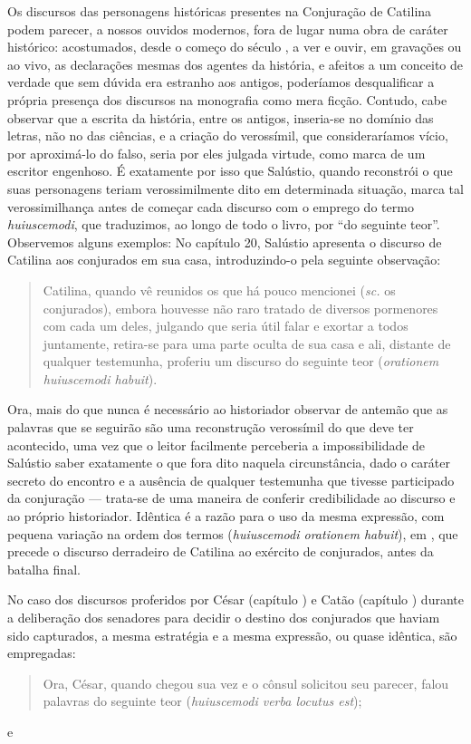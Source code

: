 Os discursos das personagens históricas presentes na Conjuração de Catilina
podem parecer, a nossos ouvidos modernos, fora de lugar numa obra de caráter
histórico: acostumados, desde o começo do século , a ver e ouvir, em
gravações ou ao vivo, as declarações mesmas dos agentes da história, e afeitos
a um conceito de verdade que sem dúvida era estranho aos antigos, poderíamos
desqualificar a própria presença dos discursos na monografia como mera ficção.
Contudo, cabe observar que a escrita da história, entre os antigos, inseria-se
no domínio das letras, não no das ciências, e a criação do verossímil, que
consideraríamos vício, por aproximá-lo do falso, seria por eles julgada
virtude, como marca de um escritor engenhoso.  É exatamente por isso que
Salústio, quando reconstrói o que suas personagens teriam verossimilmente dito
em determinada situação, marca tal verossimilhança antes de começar cada
discurso com o emprego do termo \emph{huiuscemodi}, que traduzimos, ao longo de
todo o livro, por “do seguinte teor”. Observemos alguns exemplos: No capítulo
20, Salústio apresenta o discurso de Catilina aos conjurados em sua casa,
introduzindo-o pela seguinte observação: \begin{quote} Catilina, quando vê
  reunidos os que há pouco mencionei (\emph{sc.} os conjurados), embora
  houvesse não raro tratado de diversos pormenores com cada um deles, julgando
  que seria útil falar e exortar a todos juntamente, retira-se para uma parte
  oculta de sua casa e ali, distante de qualquer testemunha, proferiu um
  discurso do seguinte teor (\emph{orationem huiuscemodi habuit}).  \end{quote}
  Ora, mais do que nunca é necessário ao historiador observar de antemão que as
  palavras que se seguirão são uma reconstrução verossímil do que deve ter
  acontecido, uma vez que o leitor facilmente perceberia a impossibilidade de
  Salústio saber exatamente o que fora dito naquela circunstância, dado o
  caráter secreto do encontro e a ausência de qualquer testemunha que tivesse
  participado da conjuração --- trata-se de uma maneira de conferir
  credibilidade ao discurso e ao próprio historiador. Idêntica é a razão para o
  uso da mesma expressão, com pequena variação na ordem dos termos
  (\emph{huiuscemodi orationem habuit}), em , que precede o discurso
  derradeiro de Catilina ao exército de conjurados, antes da batalha final.

No caso dos discursos proferidos por César (capítulo ) e Catão (capítulo )
durante a deliberação dos senadores para decidir o destino dos conjurados que
haviam sido capturados, a mesma estratégia e a mesma expressão, ou quase
idêntica, são empregadas: \begin{quote} Ora, César, quando chegou sua vez e o
  cônsul solicitou seu parecer, falou palavras do seguinte teor
  (\emph{huiuscemodi verba locutus est});

\end{quote} e

